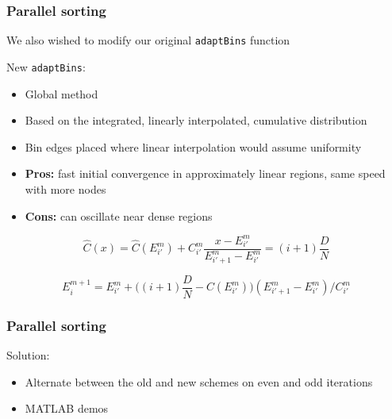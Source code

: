\documentclass[usernames,dvipsnames]{beamer}
\begin{document}
\begin{frame}
	\frametitle{Parallel sorting}
	
	We also wished to modify our original \texttt{adaptBins} function
	
	
	\begin{block}{New \texttt{adaptBins}:}
		\begin{itemize}
			\item Global method
			\item Based on the integrated, linearly interpolated, cumulative distribution
			\item Bin edges placed where linear interpolation would assume uniformity
			\item \textbf{Pros:} fast initial convergence in approximately linear regions, same speed with more nodes
			\item \textbf{Cons:} can oscillate near dense regions
		\end{itemize}
	\end{block}
	
	\vspace{-5pt}
	
	\begin{equation}
		\hat C(x) = \hat C(E^m_{i'}) + C^m_{i'} \dfrac{x - E^m_{i'}}{E^m_{{i'}+1} - E^m_{i'}} = (i+1) \dfrac{D}{N}
	\end{equation}
	
	\begin{equation}
		E^{m+1}_i = E^m_{i'} + \Big( (i+1) \dfrac{D}{N} - C(E^m_{i'}) \Big) (E^m_{{i'}+1} - E^m_{i'}) / C^m_{i'}
	\end{equation}
	
\end{frame}

\begin{frame}
	\frametitle{Parallel sorting}
	
	\begin{block}{Solution:}
		\begin{itemize}
			\item Alternate between the old and new schemes on even and odd iterations
			\item MATLAB demos
		\end{itemize}
	\end{block}
	
\end{frame}
\end{document}
